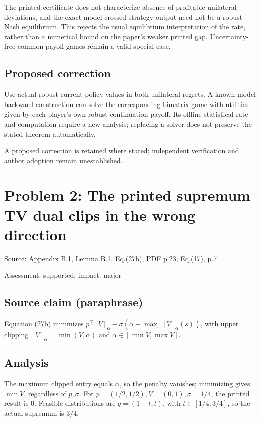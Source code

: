 \documentclass[11pt]{article}
\begin{document}
The printed certificate does not characterize absence of profitable unilateral deviations, and the exact-model crossed strategy output need not be a robust Nash equilibrium. This rejects the usual equilibrium interpretation of the rate, rather than a numerical bound on the paper’s weaker printed gap. Uncertainty-free common-payoff games remain a valid special case.

\subsection*{Proposed correction}

Use actual robust current-policy values in both unilateral regrets. A known-model backward construction can solve the corresponding bimatrix game with utilities given by each player’s own robust continuation payoff. Its offline statistical rate and computation require a new analysis; replacing a solver does not preserve the stated theorem automatically.

A proposed correction is retained where stated; independent verification and author adoption remain unestablished.

\section*{Problem 2: The printed supremum TV dual clips in the wrong direction}

Source: Appendix B.1, Lemma B.1, Eq.(27b), PDF p.23; Eq.(17), p.7

Assessment: supported; impact: major

\subsection*{Source claim (paraphrase)}

Equation (27b) minimizes \(p^\top[V]_\alpha-\sigma(\alpha-\max_s[V]_\alpha(s))\), with upper clipping \([V]_\alpha=\min(V,\alpha)\) and \(\alpha\in[\min V,\max V]\).

\subsection*{Analysis}

The maximum clipped entry equals \(\alpha\), so the penalty vanishes; minimizing gives \(\min V\), regardless of \(p,\sigma\). For \(p=(1/2,1/2),V=(0,1),\sigma=1/4\), the printed result is \(0\). Feasible distributions are \(q=(1-t,t)\), with \(t\in[1/4,3/4]\), so the actual supremum is \(3/4\).
\end{document}

